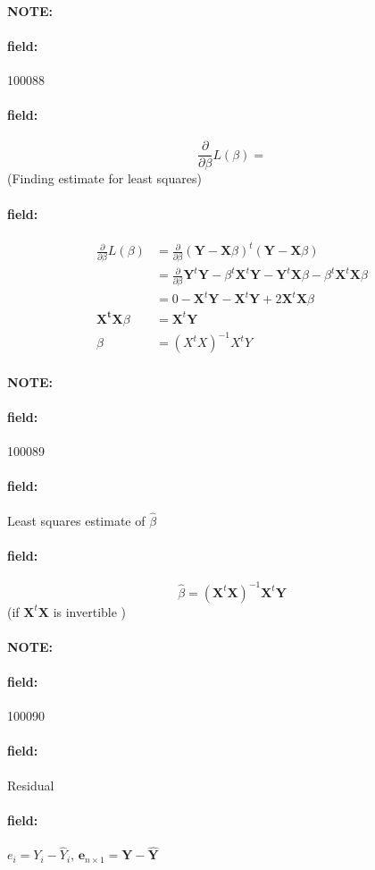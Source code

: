 \documentclass[12pt]{article}
\newenvironment{note}{\paragraph{NOTE:}}{}
\newenvironment{field}{\paragraph{field:}}{}
\begin{document}
\begin{note} \begin{field} \tiny 100088 \end{field}
 \begin{field}
  $$  \frac{\partial}{\partial \beta} L(\beta) = $$ (Finding estimate for least squares)
 \end{field}
 \begin{field}
  \begin{align*}
   \frac{\partial}{\partial \beta} L(\beta) & = \frac{\partial}{\partial \beta} (\mathbf{Y} - \mathbf{X}\beta)^t(\mathbf{Y} - \mathbf{X}\beta) \\
                                            & = \frac{\partial}{\partial \beta}  \mathbf{Y}^t \mathbf{Y} - \beta^t \mathbf{X}^t
   \textbf{Y} - \mathbf{Y}^t \mathbf{X}\beta - \beta^t \mathbf{X}^t \mathbf{X} \beta                                                           \\
                                            & = 0 - \mathbf{X}^t \mathbf{Y} - \mathbf{X}^t \mathbf{Y} + 2 \mathbf{X}^t \mathbf{X} \beta        \\
   \mathbf{X^t}\mathbf{X}\beta &= \mathbf{X}^t \mathbf{Y}\\
   \beta &= (X^tX)^{-1}X^tY
  \end{align*}
 \end{field}
\end{note}

\begin{note} \begin{field} \tiny 100089 \end{field}
 \begin{field}
  Least squares estimate of $\hat{\beta}$
 \end{field}
 \begin{field}
  $$ \hat{\beta} = (\mathbf{X}^t \mathbf{X})^{-1} \mathbf{X}^t \mathbf{Y} $$ (if $\mathbf{X}^t \mathbf{X}$ is invertible )
 \end{field}
\end{note}

\begin{note} \begin{field} \tiny 100090 \end{field}
 \begin{field}
  Residual
 \end{field}
 \begin{field}
  $e_i = Y_i - \hat{Y}_i$, $\mathbf{e}_{n\times 1} = \mathbf{Y} - \hat{\mathbf{Y}}$
 \end{field}
\end{note}
\end{document}
